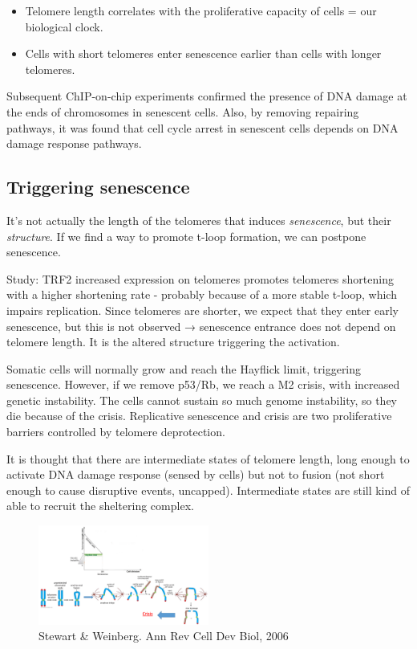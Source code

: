 \begin{itemize}
\tightlist
\item
  Telomere length correlates with the proliferative capacity of cells =
  our biological clock.
\item
  Cells with short telomeres enter senescence earlier than cells with
  longer telomeres.
\end{itemize}

Subsequent ChIP-on-chip experiments confirmed the presence of DNA damage
at the ends of chromosomes in senescent cells. Also, by removing
repairing pathways, it was found that cell cycle arrest in senescent
cells depends on DNA damage response pathways.

\hypertarget{triggering-senescence}{%
\subsection{Triggering senescence}\label{triggering-senescence}}

It's not actually the length of the telomeres that induces
\emph{senescence}, but their \emph{structure}. If we find a way to
promote t-loop formation, we can postpone senescence.

Study: TRF2 increased expression on telomeres promotes telomeres
shortening with a higher shortening rate - probably because of a more
stable t-loop, which impairs replication. Since telomeres are shorter,
we expect that they enter early senescence, but this is not observed →
senescence entrance does not depend on telomere length. It is the
altered structure triggering the activation.

Somatic cells will normally grow and reach the Hayflick limit,
triggering senescence. However, if we remove p53/Rb, we reach a M2
crisis, with increased genetic instability. The cells cannot sustain so
much genome instability, so they die because of the crisis. Replicative
senescence and crisis are two proliferative barriers controlled by
telomere deprotection.

It is thought that there are intermediate states of telomere length,
long enough to activate DNA damage response (sensed by cells) but not to
fusion (not short enough to cause disruptive events, uncapped).
Intermediate states are still kind of able to recruit the sheltering
complex.

\begin{figure}
\centering
\includegraphics[width=0.5\textwidth]{../_resources/Screen_Shot_2022-12-15_at_22-39-00.png}
\caption{Stewart \& Weinberg. Ann Rev Cell Dev Biol, 2006}
\end{figure}

